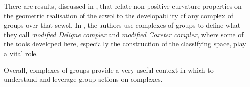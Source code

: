 There are results, discussed in \cite[Section 6]{haefliger_complexes_1991}, that relate non-positive curvature properties on the geometric realisation of the scwol to the developability of any complex of groups over that scwol.
In \cite{charney_davis_kpi_1995}, the authors use complexes of groups to define what they call \emph{modified Deligne complex} and \emph{modified Coxeter complex}, where some of the tools developed here, especially the construction of the classifying space, play a vital role.

Overall, complexes of groups provide a very useful context in which to understand and leverage group actions on complexes.

